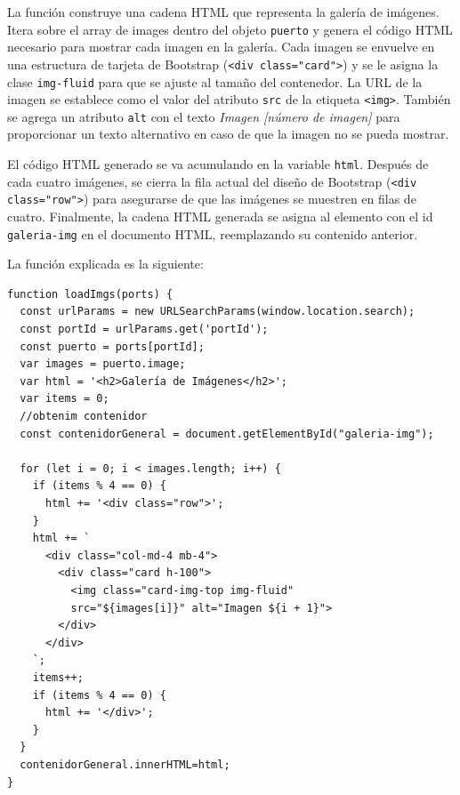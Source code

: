 \documentclass{article}
\begin{document}
\begin{itemize}
    La función construye una cadena HTML que representa la galería de imágenes. Itera sobre el array de images dentro del objeto \texttt{puerto} y genera el código HTML necesario para mostrar cada imagen en la galería. Cada imagen se envuelve en una estructura de tarjeta de Bootstrap (\texttt{<div class="card">}) y se le asigna la clase \texttt{img-fluid} para que se ajuste al tamaño del contenedor. La URL de la imagen se establece como el valor del atributo \texttt{src} de la etiqueta \texttt{<img>}. También se agrega un atributo \texttt{alt} con el texto \textit{Imagen [número de imagen]} para proporcionar un texto alternativo en caso de que la imagen no se pueda mostrar.
    
    El código HTML generado se va acumulando en la variable \texttt{html}. Después de cada cuatro imágenes, se cierra la fila actual del diseño de Bootstrap (\texttt{<div class="row">}) para asegurarse de que las imágenes se muestren en filas de cuatro. Finalmente, la cadena HTML generada se asigna al elemento con el id \texttt{galeria-img} en el documento HTML, reemplazando su contenido anterior.

    La función explicada es la siguiente:
    \begin{verbatim}
function loadImgs(ports) {
  const urlParams = new URLSearchParams(window.location.search);
  const portId = urlParams.get('portId');
  const puerto = ports[portId];
  var images = puerto.image;
  var html = '<h2>Galería de Imágenes</h2>';
  var items = 0;
  //obtenim contenidor
  const contenidorGeneral = document.getElementById("galeria-img");

  for (let i = 0; i < images.length; i++) {
    if (items % 4 == 0) {
      html += '<div class="row">';
    }
    html += `
      <div class="col-md-4 mb-4">
        <div class="card h-100">
          <img class="card-img-top img-fluid" 
          src="${images[i]}" alt="Imagen ${i + 1}">
        </div>
      </div>
    `;
    items++;
    if (items % 4 == 0) {
      html += '</div>';
    }
  }
  contenidorGeneral.innerHTML=html;
}
    \end{verbatim}


\end{itemize}
\end{document}
